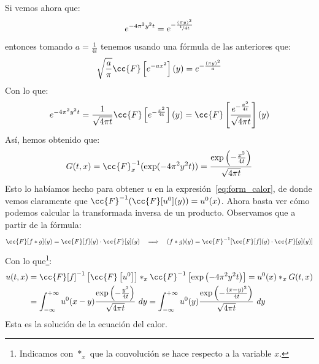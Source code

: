 \noindent
Si vemos ahora que:
\begin{equation*}
    e^{-4\pi^2 y^2 t} = e^{-\frac{{(\pi y)}^{2}}{\nicefrac{1}{4t}}}
\end{equation*}
entonces tomando $a = \frac{1}{4t}$ tenemos usando una fórmula de las anteriores que:
\begin{equation*}
    \sqrt{\frac{a}{\pi}} \cc{F}\left[e^{-ax^2}\right](y) = e^{-\frac{{(\pi y)}^{2}}{a}}
\end{equation*}
Con lo que:
\begin{equation*}
    e^{-4\pi^2 y^2 t} = \frac{1}{\sqrt{4\pi t}}\cc{F}\left[e^{-\frac{x^2}{4t}}\right](y) = \cc{F}\left[\frac{e^{-\frac{x^2}{4t}}}{\sqrt{4\pi t}}\right](y)
\end{equation*}
Así, hemos obtenido que:
\begin{equation*}
    G(t,x) = \cc{F}^{-1}_x(\exp(-4\pi^2y^2 t)) = \frac{\exp\left(-\frac{x^2}{4t}\right)}{\sqrt{4\pi t}}
\end{equation*}
Esto lo habíamos hecho para obtener $u$ en la expresión~\eqref{eq:form_calor}, de donde vemos claramente que $\cc{F}^{-1}(\cc{F}[u^0](y)) = u^0(x)$. Ahora basta ver cómo podemos calcular la transformada inversa de un producto. Observamos que a partir de la fórmula:
\begin{equation*}
    \cc{F}[f\ast g](y) = \cc{F}[f](y) \cdot \cc{F}[g](y) \quad\Longrightarrow\quad (f\ast g)(y) = \cc{F}^{-1}[\cc{F}[f](y) \cdot \cc{F}[g](y)]
\end{equation*}
Con lo que\footnote{Indicamos con $\ast_x$ que la convolución se hace respecto a la variable $x$.}:
\begin{align*}
    u(t,x)&= \cc{F}[f]^{-1}\left[\cc{F}\left[u^0\right]\right]\ast_x \cc{F}^{-1}\left[\exp\left(-4\pi^2y^2t\right)\right] = u^0(x)\ast_x G(t,x) \\
          &= \int_{-\infty}^{+\infty} u^0(x-y)\frac{\exp\left(-\frac{y^2}{4t}\right)}{\sqrt{4\pi t}}~dy 
          = \int_{-\infty}^{+\infty} u^0(y)\frac{\exp\left(-\frac{{(x-y)}^{2}}{4t}\right)}{\sqrt{4\pi t}}~dy 
\end{align*}
Esta es la solución de la ecuación del calor.

